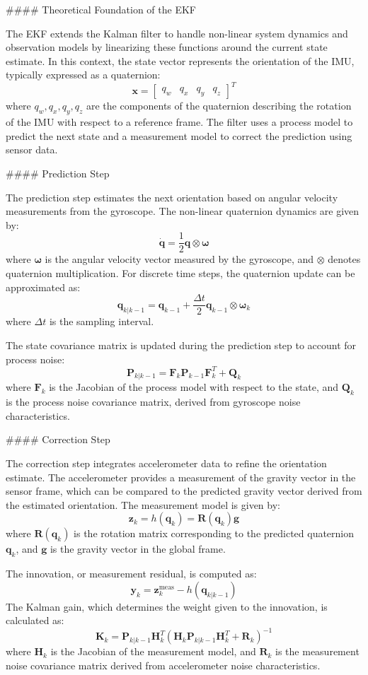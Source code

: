 #### Theoretical Foundation of the EKF

The EKF extends the Kalman filter to handle non-linear system dynamics and observation models by linearizing these functions around the current state estimate. In this context, the state vector represents the orientation of the IMU, typically expressed as a quaternion:
\[
\mathbf{x} = 
\begin{bmatrix}
q_w & q_x & q_y & q_z
\end{bmatrix}^T
\]
where \( q_w, q_x, q_y, q_z \) are the components of the quaternion describing the rotation of the IMU with respect to a reference frame. The filter uses a process model to predict the next state and a measurement model to correct the prediction using sensor data.

#### Prediction Step

The prediction step estimates the next orientation based on angular velocity measurements from the gyroscope. The non-linear quaternion dynamics are given by:
\[
\dot{\mathbf{q}} = \frac{1}{2} \mathbf{q} \otimes \mathbf{\omega}
\]
where \( \mathbf{\omega} \) is the angular velocity vector measured by the gyroscope, and \( \otimes \) denotes quaternion multiplication. For discrete time steps, the quaternion update can be approximated as:
\[
\mathbf{q}_{k|k-1} = \mathbf{q}_{k-1} + \frac{\Delta t}{2} \mathbf{q}_{k-1} \otimes \mathbf{\omega}_k
\]
where \( \Delta t \) is the sampling interval.

The state covariance matrix is updated during the prediction step to account for process noise:
\[
\mathbf{P}_{k|k-1} = \mathbf{F}_k \mathbf{P}_{k-1} \mathbf{F}_k^T + \mathbf{Q}_k
\]
where \( \mathbf{F}_k \) is the Jacobian of the process model with respect to the state, and \( \mathbf{Q}_k \) is the process noise covariance matrix, derived from gyroscope noise characteristics.

#### Correction Step

The correction step integrates accelerometer data to refine the orientation estimate. The accelerometer provides a measurement of the gravity vector in the sensor frame, which can be compared to the predicted gravity vector derived from the estimated orientation. The measurement model is given by:
\[
\mathbf{z}_k = h(\mathbf{q}_k) = \mathbf{R}(\mathbf{q}_k) \mathbf{g}
\]
where \( \mathbf{R}(\mathbf{q}_k) \) is the rotation matrix corresponding to the predicted quaternion \( \mathbf{q}_k \), and \( \mathbf{g} \) is the gravity vector in the global frame.

The innovation, or measurement residual, is computed as:
\[
\mathbf{y}_k = \mathbf{z}_k^{\text{meas}} - h(\mathbf{q}_{k|k-1})
\]
The Kalman gain, which determines the weight given to the innovation, is calculated as:
\[
\mathbf{K}_k = \mathbf{P}_{k|k-1} \mathbf{H}_k^T (\mathbf{H}_k \mathbf{P}_{k|k-1} \mathbf{H}_k^T + \mathbf{R}_k)^{-1}
\]
where \( \mathbf{H}_k \) is the Jacobian of the measurement model, and \( \mathbf{R}_k \) is the measurement noise covariance matrix derived from accelerometer noise characteristics.


